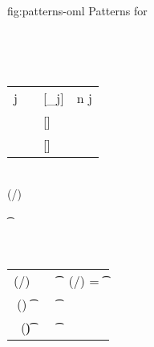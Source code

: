 \documentclass[acmsmall,screen,nonacm,review]{acmart}
\begin{document}
\begin{mathparfig}
  {fig:patterns-oml}
  {Patterns for \OML}
  \begin{bnfgrammar}
    \\
    \entry[Constraints]{\c}{
      \dots
      \and \labenv(\elab/\ct) \leq \ta \to \tb
      \and \labenv(\elab/\T) \leq \ta \to \tb
      \andcr \cscm \leq \t
      \and \ts \leq \t
      \andcr \x \leq \cscm
      \and \x \leq \ts
    }
 \end{bnfgrammar}
  \\
  \newcommand{\Mrule}[5][]{{#2} \Matches {(#3)} \; #4 &\eqdef& {#5} & #1}
  \begin{tabular}{RCLL}
    \Mrule[ n \geq j]
      {\cpatprod \tv j}
      {\any \tvcs \Pi\iton \tvcs} \tvbs
      {[\tv \is \tvb_j]}
    \\[1ex]
    \Mrule
      {\cpatrcd \ct}
      {\any \tvcs \Tapp} \tvbs
      {[\ct \is \T]}
    \\[1ex]
    \Mrule
      {\cpatpoly \cscm}
      {\any \tvcs \tpoly \ts} \tvbs
      {[\cscm \is \ts \where{\tvcs \is \tvbs}]}
  \end{tabular}
  \\
    {\semenv \th \labenv(\elab/\ct) \leq \ta \to \tb}

    {\semenv \th \cscm \leq \t}

    {\semenv \th \x \leq \cscm}
  \\
  \newcommand{\Srule}[3][]{{#2} &\eqdef& {#3} & {#1}}
  \begin{tabular}{RCLL}
    \Srule[ \labenv(\elab/\T) = \tfor \tvs \t \to \Tapp \tvs]
      {\labenv(\elab/\T) \leq \ta \to \tb}
      {\cexists \tvs \cunif \ta \t \cand \cunif \tb {\Tapp \tvs}}
    \\[1ex]
    \Srule
      {(\tfor \tvs \tp) \leq \t}
      {\cexists \tvs \cunif \tp \t}
    \\[1ex]
    \Srule
      {\x \leq (\tfor \tvs \t)}
      {\cfor \tvs \capp \x \t}
  \end{tabular}

\end{mathparfig}


\end{document}
